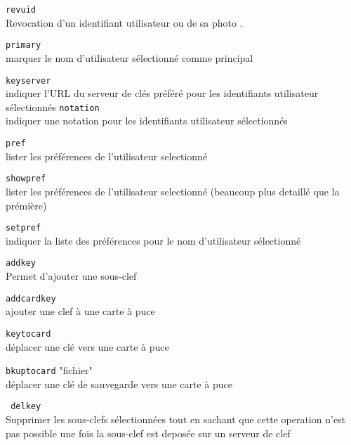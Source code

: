                \texttt{revuid }\\ 
    
              Revocation d'un  identifiant utilisateur ou de sa photo .

               \texttt{primary}\\ 
                      marquer le nom d'utilisateur sélectionné comme principal


               \texttt{keyserver}\\ 
                     indiquer l'URL du serveur de clés préféré pour les identifiants utilisateur sélectionnés
               \texttt{notation}\\ 
                     indiquer une notation pour les identifiants utilisateur sélectionnés


               \texttt{pref   }\\ 
                    lister les préférences de l'utilisateur selectionné 

               \texttt{showpref}\\ 
                     lister les préférences de l'utilisateur selectionné  (beaucoup plus detaillé que la prémière)
                     
                    

               \texttt{setpref }\\ 
                     
                indiquer la liste des préférences pour le nom d'utilisateur
                sélectionné


               \texttt{addkey }\\ 
             
             Permet d'ajouter une sous-clef


               \texttt{addcardkey}\\ 
                    ajouter une clef à une carte à puce


               \texttt{keytocard}\\ 
                      déplacer une clé vers une carte à puce

               \texttt{bkuptocard} "fichier" \\
                     déplacer une clé de sauvegarde vers une carte à puce


              \texttt{ delkey}\\ 
              Supprimer les sous-clefs sélectionnées tout en sachant que cette operation n'est pas possible une fois la sous-clef est 
              deposée sur un serveur de clef
              
